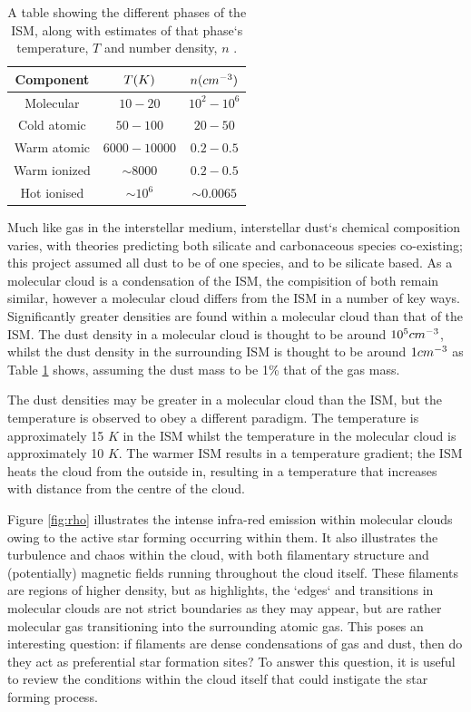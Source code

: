\documentclass{report}
\begin{document}
\begin{table}[h]
  \centering
   \begin{tabular}{||c c c||}
   \hline
   Component & $T\/(K)$ & $n\/(cm^{-3})$ \\ [0.5ex]
   \hline\hline
   Molecular    & $10-20$      & $10^{2}-10^{6}$ \\
   \hline
   Cold atomic  & $50-100$     & $20-50$ \\
   \hline
   Warm atomic  & $6000-10000$ & $0.2-0.5$ \\
   \hline
   Warm ionized & $\sim8000$    & $0.2-0.5$ \\
   \hline
   Hot ionised  & $\sim10^{6}$  & $\sim0.0065$ \\ [1ex]
   \hline
   \end{tabular}
   \caption{A table showing the different phases of the ISM, along with estimates of that phase`s temperature, $T$ and number density, $n$ \parencite{ism}.}
   \label{table:ism}
\end{table}

Much like gas in the interstellar medium, interstellar dust`s chemical composition varies, with theories predicting both silicate and carbonaceous species co-existing; this project assumed all dust to be of one species, and to be silicate based. As a molecular cloud is a condensation of the ISM, the compisition of both remain similar, however a molecular cloud differs from the ISM in a number of key ways. Significantly greater densities are found within a molecular cloud than that of the ISM. The dust density in a molecular cloud is thought to be around $10^{5}\/cm^{-3}$, whilst the dust density in the surrounding ISM is thought to be around $1\/cm^{-3}$ as Table \ref{table:ism} shows, assuming the dust mass to be 1\% that of the gas mass.

The dust densities may be greater in a molecular cloud than the ISM, but the temperature is observed to obey a different paradigm. The temperature is approximately 15 $K$ in the ISM whilst the temperature in the molecular cloud is approximately 10 $K$. The warmer ISM results in a temperature gradient; the ISM heats the cloud from the outside in, resulting in a temperature that increases with distance from the centre of the cloud.

Figure \ref{fig:rho} illustrates the intense infra-red emission within molecular clouds owing to the active star forming occurring within them. It also illustrates the turbulence and chaos within the cloud, with both filamentary structure and (potentially) magnetic fields running throughout the cloud itself. These filaments are regions of higher density, but as \textcite{evo-mol} highlights, the `edges` and transitions in molecular clouds are not strict boundaries as they may appear, but are rather molecular gas transitioning into the surrounding atomic gas. This poses an interesting question: if filaments are dense condensations of gas and dust, then do they act as preferential star formation sites? To answer this question, it is useful to review the conditions within the cloud itself that could instigate the star forming process.
\end{document}
